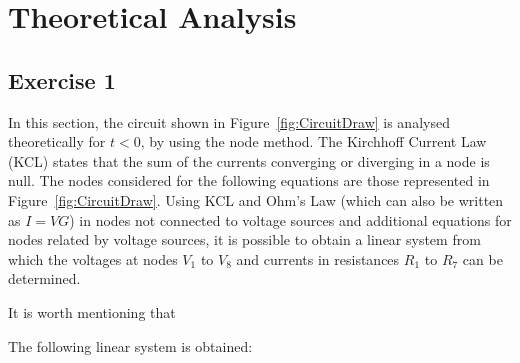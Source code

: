 \section{Theoretical Analysis}
\label{sec:analysis}

\subsection{Exercise 1}

In this section, the circuit shown in Figure~\ref{fig:CircuitDraw} is analysed theoretically for $t<0$, by using the node method. The Kirchhoff Current Law (KCL) states that the sum of the currents converging or diverging in a node is null. The nodes considered for the following equations are those represented in Figure~\ref{fig:CircuitDraw}. Using KCL and Ohm's Law (which can also be written as $I=VG$) in nodes not connected to voltage sources and additional equations for nodes related by voltage sources, it is possible to obtain a linear system from which the voltages at nodes $V_1$ to $V_8$ and currents in resistances $R_1$ to $R_7$ can be determined.

\par
It is worth mentioning that 

\par
\vspace{1mm}

The following linear system is obtained:

